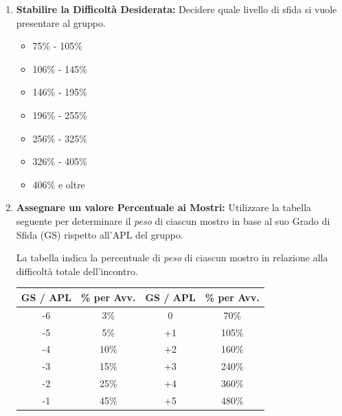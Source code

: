 \documentclass[a4paper,twoside,openany]{book}
\begin{document}
\begin{multicols}{2}
\begin{enumerate}[leftmargin=*]
	
	\item \textbf{Stabilire la Difficoltà Desiderata:} Decidere quale livello di sfida si vuole presentare al gruppo.
	
	
	
	
	
\begin{itemize}[leftmargin=*] \setlength{\itemsep}{0pt}
	\item {} 75\% - 105\% 
	\item {} 106\% - 145\% 
	\item {} 146\% - 195\% 
	\item {} 196\% - 255\% 
	\item {} 256\% - 325\% 
	\item {} 326\% - 405\% 
	\item {} 406\% e oltre 
\end{itemize}


	
	
	
	\item \textbf{Assegnare un valore Percentuale ai Mostri:} Utilizzare la tabella seguente per determinare il \emph{peso} di ciascun mostro in base al suo Grado di Sfida (GS) rispetto all'APL del gruppo.
	
	La tabella indica la percentuale di \emph{peso} di ciascun mostro in relazione alla difficoltà totale dell'incontro.
	
	\noindent\begin{tabular}{c|c|c|c}
		\textbf{GS / APL} & \textbf{\% per Avv.} &\textbf{GS / APL} & \textbf{\% per Avv.}\\
		\toprule
		-6 & 3\% &  0 & 70\% \\
		-5 & 5\% & +1 & 105\% \\
		-4 & 10\% & +2 & 160\% \\
		-3 & 15\% & +3 & 240\% \\
		-2 & 25\% & +4 & 360\% \\
		-1 & 45\% & +5 & 480\% \\
	\end{tabular}
	

\end{enumerate}
\end{multicols}
\end{document}

